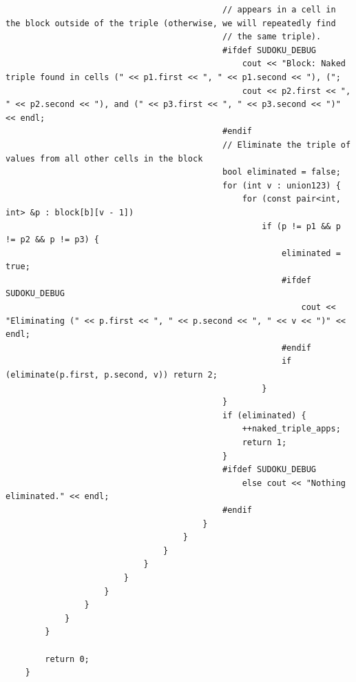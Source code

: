 \documentclass{article}
\begin{document}
\begin{lstlisting}
                                            // appears in a cell in the block outside of the triple (otherwise, we will repeatedly find
                                            // the same triple).
                                            #ifdef SUDOKU_DEBUG
                                                cout << "Block: Naked triple found in cells (" << p1.first << ", " << p1.second << "), (";
                                                cout << p2.first << ", " << p2.second << "), and (" << p3.first << ", " << p3.second << ")" << endl;
                                            #endif
                                            // Eliminate the triple of values from all other cells in the block
                                            bool eliminated = false;
                                            for (int v : union123) {
                                                for (const pair<int, int> &p : block[b][v - 1])
                                                    if (p != p1 && p != p2 && p != p3) {
                                                        eliminated = true;
                                                        #ifdef SUDOKU_DEBUG
                                                            cout << "Eliminating (" << p.first << ", " << p.second << ", " << v << ")" << endl;
                                                        #endif
                                                        if (eliminate(p.first, p.second, v)) return 2;
                                                    }
                                            }
                                            if (eliminated) {
                                                ++naked_triple_apps;
                                                return 1;
                                            }
                                            #ifdef SUDOKU_DEBUG
                                                else cout << "Nothing eliminated." << endl;
                                            #endif
                                        }
                                    }
                                }
                            }
                        }
                    }
                }
            }
        }

        return 0;
    }


\end{lstlisting}
\end{document}
